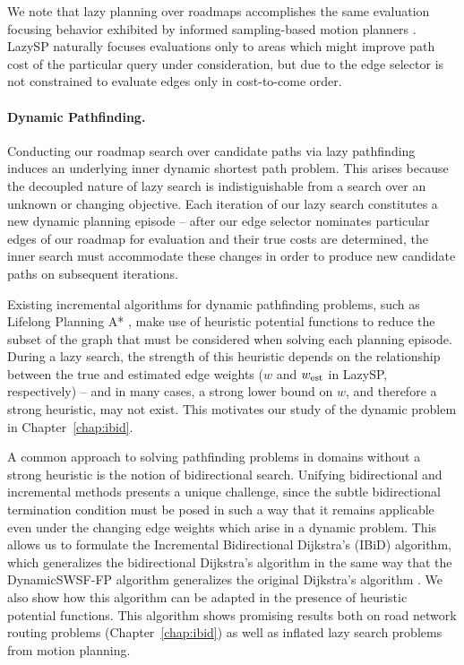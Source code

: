 We note that lazy planning over roadmaps accomplishes
the same evaluation focusing behavior exhibited by
informed sampling-based motion planners
\citep{gammell2014informedrrtstar, gammell2015bitstar}.
LazySP naturally focuses evaluations only to areas which might improve
path cost of the particular query under consideration,
but due to the edge selector is not constrained to evaluate edges
only in cost-to-come order.

\paragraph{Dynamic Pathfinding.}
Conducting our roadmap search over candidate paths via lazy
pathfinding
induces an underlying inner dynamic shortest path problem.
This arises because the decoupled nature of lazy search
is indistiguishable from a search over an unknown or changing objective.
Each iteration of our lazy search constitutes a new dynamic planning
episode --
after our edge selector nominates particular edges of our roadmap
for evaluation and their true costs are determined,
the inner search must accommodate these changes in order to produce
new candidate paths on subsequent iterations.

Existing incremental algorithms for dynamic pathfinding problems,
such as Lifelong Planning A* \citep{koenig2004lpastar},
make use of heuristic potential functions to reduce the subset of
the graph that must be considered when solving each planning episode.
During a lazy search,
the strength of this heuristic depends on
the relationship between the true and estimated edge weights
($w$ and $w_{\mbox{\scriptsize est}}$ in LazySP, respectively)
-- and in many cases, a strong lower bound on $w$,
and therefore a strong heuristic, may not exist.
This motivates our study of the dynamic problem
in Chapter~\ref{chap:ibid}.

A common approach to solving pathfinding problems in domains without
a strong heuristic is the notion of bidirectional search.
Unifying bidirectional and incremental methods presents a unique
challenge,
since the subtle bidirectional termination condition must be
posed in such a way that it remains applicable even under the
changing edge weights which arise in a dynamic problem.
This allows us to formulate the Incremental Bidirectional Dijkstra's
(IBiD) algorithm,
which generalizes the bidirectional Dijkstra's algorithm
\citep{goldberg2005spexternalmemory}
in the same way that the DynamicSWSF-FP algorithm
\citep{ramalingam1996dynamicswsffp} generalizes the original
Dijkstra's algorithm \citep{dijkstra1959anote}.
We also show how this algorithm can be adapted in the presence of
heuristic potential functions.
This algorithm shows promising results both on road network routing
problems (Chapter~\ref{chap:ibid})
as well as inflated lazy search problems from motion planning.

